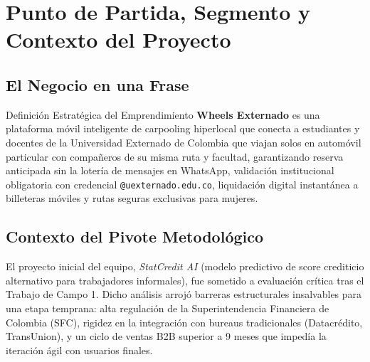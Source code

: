 \documentclass[11pt,a4paper]{article}
\begin{document}
\section{Punto de Partida, Segmento y Contexto del Proyecto}

\subsection{El Negocio en una Frase}
\begin{externadobox}{Definici\'on Estrat\'egica del Emprendimiento}
\textbf{Wheels Externado} es una plataforma m\'ovil inteligente de carpooling hiperlocal que conecta a estudiantes y docentes de la Universidad Externado de Colombia que viajan solos en autom\'ovil particular con compa\~neros de su misma ruta y facultad, garantizando reserva anticipada sin la loter\'ia de mensajes en WhatsApp, validaci\'on institucional obligatoria con credencial \texttt{@uexternado.edu.co}, liquidaci\'on digital instant\'anea a billeteras m\'oviles y rutas seguras exclusivas para mujeres.
\end{externadobox}

\subsection{Contexto del Pivote Metodol\'ogico}
El proyecto inicial del equipo, \textit{StatCredit AI} (modelo predictivo de score crediticio alternativo para trabajadores informales), fue sometido a evaluaci\'on cr\'itica tras el Trabajo de Campo 1. Dicho an\'alisis arroj\'o barreras estructurales insalvables para una etapa temprana: alta regulaci\'on de la Superintendencia Financiera de Colombia (SFC), rigidez en la integraci\'on con bureaus tradicionales (Datacr\'edito, TransUnion), y un ciclo de ventas B2B superior a 9 meses que imped\'ia la iteraci\'on \'agil con usuarios finales.
\end{document}
